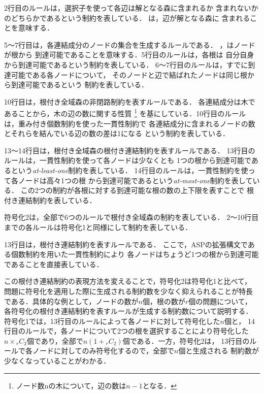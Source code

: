 2行目のルールは，選択子を使って各辺は解となる森に含まれるか
含まれないかのどちらかであるという制約を表している．
は，辺が解となる森に
含まれることを意味する．

5～7行目は，各連結成分のノードの集合を生成するルールである．
，はノードが根から
到達可能であることを意味する．5行目のルールは，各根は
自分自身から到達可能であるという制約を表している．
6～7行目のルールは，すでに到達可能である各ノードについて，
そのノードと辺で結ばれたノードは同じ根から到達可能であるという
制約を表している．

10行目は，根付き全域森の非閉路制約を表すルールである．
各連結成分は木であることから，木の辺の数に関する性質
\footnote{ノード数nの木について，辺の数は$n - 1$となる．}
を基にしている．10行目のルールは，重み付き個数制約を使った一貫性制約で
各連結成分に含まれるノードの数とそれらを結んでいる辺の数の差は1になる
という制約を表している．

13～14行目は，根付き全域森の根付き連結制約を表すルールである．
13行目のルールは，一貫性制約を使って各ノードは少なくとも
1つの根から到達可能であるという\textit{at-least-one}制約を表している．
14行目のルールは，一貫性制約を使って各ノードは高々1つの根
から到達可能であるという\textit{at-most-one}制約を表している．
この2つの制約が各根に対する到達可能な根の数の上下限を表すことで
根付き連結制約を表している．

符号化2は，全部で6つのルールで根付き全域森の制約を表している．
2～10行目までの各ルールは符号化1と同様にして制約を表している．

13行目は，根付き連結制約を表すルールである．
ここで，ASPの拡張構文である個数制約を用いた一貫性制約により
各ノードはちょうど1つの根から到達可能であることを直接表している．

この根付き連結制約の表現方法を変えることで，符号化2は符号化1と比べて，
問題に符号化を適用した際に生成される制約数を少なく抑えられることが特長
である．具体的な例として，ノードの数が$n$個，根の数が$r$個の問題について，
各符号化の根付き連結制約を表すルールが生成する制約数について説明する．
符号化1では，13行目のルールによって各ノードに対して符号化した$n$個と，
14行目のルールで，各ノードについて2つの根を選択することにより符号化した
$n\times{}_rC_2$個であり，全部で$n(1+{}_rC_2)$個である．一方，符号化2は，
13行目のルールで各ノードに対してのみ符号化するので，全部で$n$個と生成される
制約数が少なくなっていることがわかる．